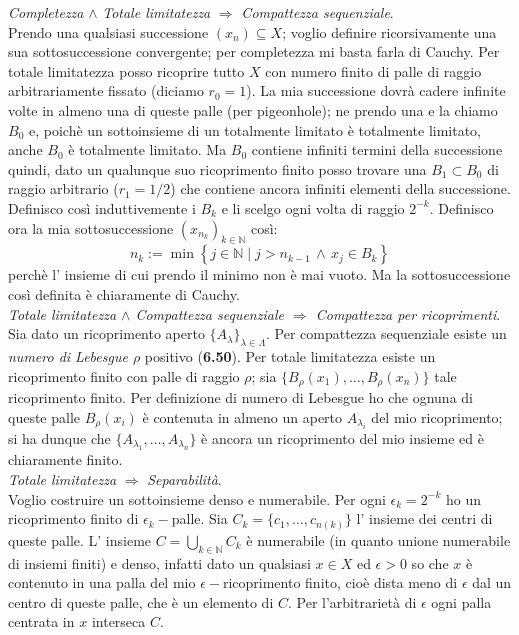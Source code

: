 \documentclass[a4paper,11pt]{article}
\newcommand{\NN}{\mathbb{N}}
\newcommand{\rec}[1]{{\bf #1}}
\begin{document}
{\it Completezza} $\wedge$ {\it Totale limitatezza} $\Rightarrow$ {\it Compattezza sequenziale}.\\
Prendo una qualsiasi successione $(x_n)\subseteq X$; voglio definire ricorsivamente una sua sottosuccessione convergente; per completezza mi basta farla di Cauchy. Per totale limitatezza posso ricoprire tutto $X$ con numero finito di palle di raggio arbitrariamente fissato (diciamo $r_0=1$). La mia successione dovrà cadere infinite volte in almeno una di queste palle (per pigeonhole); ne prendo una e la chiamo $B_0$ e, poichè un sottoinsieme di un totalmente limitato è totalmente limitato, anche $B_0$ è totalmente limitato. Ma $B_0$ contiene infiniti termini della successione quindi, dato un qualunque suo ricoprimento finito posso trovare una $B_1\subset B_0$ di raggio arbitrario ($r_1=1/2$) che contiene ancora infiniti elementi della successione. Definisco così induttivemente i $B_k$ e li scelgo ogni volta di raggio $2^{-k}$. Definisco ora la mia sottosuccessione $(x_{n_k})_{k\in\NN}$ così:
$$
n_{k}:=\min\left\{j\in\NN\mid j>n_{k-1}\, \wedge\, x_j\in B_k\right\}
$$ 
perchè l' insieme di cui prendo il minimo non è mai vuoto. Ma la sottosuccessione così definita è chiaramente di Cauchy.\\
{\it Totale limitatezza $\wedge$ Compattezza sequenziale $\Rightarrow$ Compattezza per ricoprimenti}.\\
Sia dato un ricoprimento aperto $\{A_{\lambda}\}_{\lambda\in\Lambda}$. Per compattezza sequenziale esiste un {\it numero di Lebesgue $\rho$} positivo (\rec{6.50}). Per totale limitatezza esiste un ricoprimento finito con palle di raggio $\rho$; sia $\{B_{\rho}(x_1),\ldots,B_{\rho}(x_n)\}$ tale ricoprimento finito. Per definizione di numero di Lebesgue ho che ognuna di queste palle $B_{\rho}(x_i)$ è contenuta in almeno un aperto $A_{\lambda_i}$ del mio ricoprimento; si ha dunque che $\{A_{\lambda_1},\ldots,A_{\lambda_n}\}$ è ancora un ricoprimento del mio insieme ed è chiaramente finito.\\
{\it Totale limitatezza} $\Rightarrow$ {\it Separabilità}.\\
Voglio costruire un sottoinsieme denso e numerabile. Per ogni $\epsilon_k=2^{-k}$ ho un ricoprimento finito di $\epsilon_k-$palle. Sia $C_k=\{c_1,\ldots,c_{n(k)}\}$ l' insieme dei centri di queste palle. L' insieme $C=\bigcup_{k\in\NN}C_k$ è numerabile (in quanto unione numerabile di insiemi finiti) e denso, infatti dato un qualsiasi $x\in X$ ed $\epsilon>0$ so che $x$ è contenuto in una palla del mio $\epsilon-$ricoprimento finito, cioè dista meno di $\epsilon$ dal un centro di queste palle, che è un elemento di $C$. Per l'arbitrarietà di $\epsilon$ ogni palla centrata in $x$ interseca $C$.\\
\end{document}

